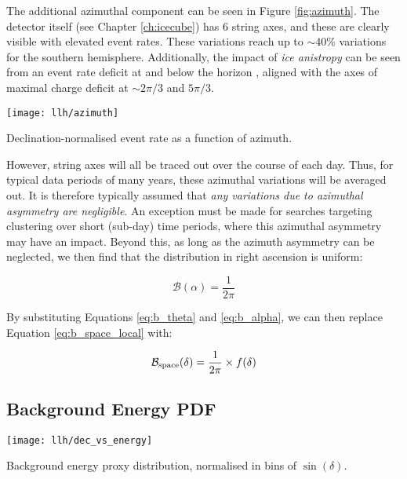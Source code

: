 The additional azimuthal component can be seen in Figure \ref{fig:azimuth}. The detector itself (see Chapter \ref{ch:icecube}) has 6 string axes, and these are clearly visible with elevated event rates. These variations reach up to $\sim40\%$ variations for the southern hemisphere. Additionally, the impact of \emph{ice anistropy} can be seen from an event rate deficit at and below the horizon , aligned with the axes of maximal charge deficit at $\sim2\pi / 3$ and $5\pi / 3$. 

\begin{marginfigure}
	\centering \texttt{[image: llh/azimuth]}
	\caption{Declination-normalised event rate as a function of azimuth.}
	\label{fig:azimuth}
\end{marginfigure}

However, string axes will all be traced out over the course of each day. Thus, for typical data periods of many years, these azimuthal variations will be averaged out. It is therefore typically assumed that \emph{any variations due to azimuthal asymmetry are negligible}.  An exception must be made for searches targeting clustering over short (sub-day) time periods, where this azimuthal asymmetry may have an impact. Beyond this, as long as the azimuth asymmetry can be neglected, we then find that the distribution in right ascension is uniform:

\begin{equation}
	\mathcal{B} (\alpha) = \frac{1}{2\pi}
	\label{eq:b_alpha}
\end{equation}

By substituting Equations \ref{eq:b_theta} and \ref{eq:b_alpha}, we can then replace Equation \ref{eq:b_space_local} with:

\begin{equation}
	\mathcal{B}_{\textup{space}} (\delta) = \frac{1}{2\pi} \times f(\delta)
	\label{eq:b_space}
\end{equation}

\subsection*{Background Energy PDF}

\begin{marginfigure}
	\centering \texttt{[image: llh/dec\_vs\_energy]}
	\caption{Background energy proxy distribution, normalised in bins of $\sin(\delta)$.}
	\label{fig:dec_vs_energy}
\end{marginfigure}

